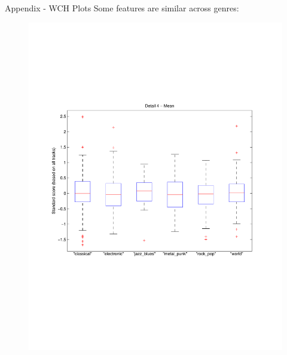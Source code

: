 \documentclass[xcolor=dvipsnames,t]{beamer} %
\begin{document}
\begin{frame}{Appendix - WCH Plots}
   Some features are similar across genres:
   ~\\[-9em]
   \begin{figure}
      \centering
      \includegraphics[width=\textwidth]{figures/wch_box_01.pdf}
   \end{figure}
\end{frame}
\end{document}
